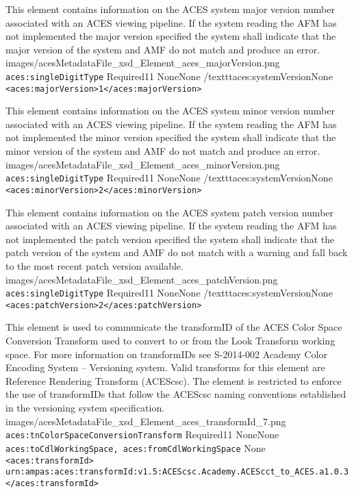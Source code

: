         {This element contains information on the ACES system major version number associated with an ACES viewing pipeline.  If the system reading the AFM has not implemented the major version specified the system shall indicate that the major version of the system and AMF do not match and produce an error.}
        {images/acesMetadataFile_xsd_Element_aces_majorVersion.png}
        {\texttt{aces:singleDigitType}}
        {Required}{1}{1}
        {None}{None}
        {/texttt{aces:systemVersion}}{None}
        {\lstinline{<aces:majorVersion>1</aces:majorVersion>}}

        {This element contains information on the ACES system minor version number associated with an ACES viewing pipeline.  If the system reading the AFM has not implemented the minor version specified the system shall indicate that the minor version of the system and AMF do not match and produce an error.}
        {images/acesMetadataFile_xsd_Element_aces_minorVersion.png}
        {\texttt{aces:singleDigitType}}
        {Required}{1}{1}
        {None}{None}
        {/texttt{aces:systemVersion}}{None}
        {\lstinline{<aces:minorVersion>2</aces:minorVersion>}}

        {This element contains information on the ACES system patch version number associated with an ACES viewing pipeline.  If the system reading the AFM has not implemented the patch version specified the system shall indicate that the patch version of the system and AMF do not match with a warning and fall back to the most recent patch version available.}
        {images/acesMetadataFile_xsd_Element_aces_patchVersion.png}
        {\texttt{aces:singleDigitType}}
        {Required}{1}{1}
        {None}{None}
        {/texttt{aces:systemVersion}}{None}
        {\lstinline{<aces:patchVersion>2</aces:patchVersion>}}

        {This element is used to communicate the transformID of the ACES Color Space Conversion Transform used to convert to or from the Look Transform working space.  For more information on transformIDs see S-2014-002 Academy Color Encoding System -- Versioning system.  Valid transforms for this element are Reference Rendering Transform (ACEScsc).  The element is restricted to enforce the use of transformIDs that follow the ACEScsc naming conventions established in the versioning system specification.}
        {images/acesMetadataFile_xsd_Element_aces_transformId_7.png}
        {\texttt{aces:tnColorSpaceConversionTransform}}
        {Required}{1}{1}
        {None}{None}
        {\texttt{aces:toCdlWorkingSpace, aces:fromCdlWorkingSpace}}
        {None}
        {\lstinline{<aces:transformId>}\\
        \lstinline{urn:ampas:aces:transformId:v1.5:ACEScsc.Academy.ACEScct_to_ACES.a1.0.3}\\
        \lstinline{</aces:transformId>}}

